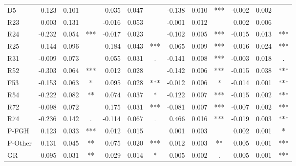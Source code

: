 \documentclass[11pt,letterpaper]{article}
\numberwithin{equation}{section}
\numberwithin{equation}{section}
\numberwithin{equation}{section}
\begin{document}
\begin{center}
\begin{table}
\begin{tabular}{|l|rrc|rrc|rrc|rrc|}
D5        & 0.123 & 0.101 &     & 0.035  & 0.047 &     & -0.138 & 0.010 & *** & -0.002 & 0.002 &     \\
R23       & 0.003 & 0.131  &     & -0.016 & 0.053 &     & -0.001 & 0.012 &     & 0.002  & 0.006 &     \\
R24       & -0.232 & 0.054 & *** & -0.017 & 0.023 &     & -0.102 & 0.005 & *** & -0.015 & 0.013 & *** \\
R25       & 0.144  & 0.096 &     & -0.184 & 0.043 & *** & -0.065 & 0.009 & *** & -0.016 & 0.024 & *** \\
R31       & -0.009 & 0.073 &     & 0.055  & 0.031 & .   & -0.141 & 0.008 & *** & -0.003 & 0.018 & .   \\
R52       & -0.303 & 0.064 & *** & 0.012   & 0.028 &     & -0.142 & 0.006  & *** & -0.015 & 0.038 & *** \\
F53       & -0.153 & 0.063 & *   & 0.095  & 0.028 & *** & -0.012 & 0.006  & *   & -0.014 & 0.001 & *** \\
R54       & -0.222 & 0.082 & **  & 0.074  & 0.037 & *   & -0.122 & 0.007 & *** & -0.015  & 0.002 & *** \\
R72       & -0.098 & 0.072 &     & 0.175  & 0.031 & *** & -0.081 & 0.007 & *** & -0.007 & 0.002 & *** \\
R74       & -0.236 & 0.142 & .   & -0.114 & 0.067 & .   & 0.466  & 0.016 & *** & -0.019 & 0.003 & *** \\
P-FGH     & 0.123 & 0.033 & *** & 0.012 & 0.015 &     & 0.001    & 0.003 &     & 0.002  & 0.001 & *   \\
P-Other   & 0.131  & 0.045 & **  & 0.075   & 0.020 & *** & 0.012  & 0.003 & **  & 0.005  & 0.001  & *** \\
GR        & -0.095 & 0.031 & **  & -0.029 & 0.014 & *   & 0.005   & 0.002 & .   & -0.005 & 0.001 & *** \\
\hline\hline
\end{tabular}
\end{table}


\end{center}
\end{document}
